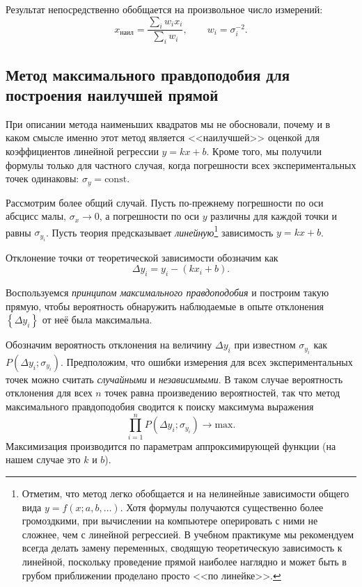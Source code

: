 \documentclass[10pt]{article}
\begin{document}
Результат непосредственно обобщается на произвольное число измерений:
\begin{equation}
x_{\text{наил}}=\frac{\sum\limits _{i}w_{i}x_{i}}{\sum\limits _{i}w_{i}},\qquad w_{i}=\sigma_{i}^{-2}.
\end{equation}

\subsection{Метод максимального правдоподобия для построения наилучшей
прямой\label{subsec:MMP}}

При описании метода наименьших квадратов мы не обосновали,
почему и в каком смысле именно этот метод является <<наилучшей>>
оценкой для коэффициентов линейной регрессии $y=kx+b$. Кроме того,
мы получили формулы только для частного случая, когда погрешности
всех экспериментальных точек одинаковы: $\sigma_{y}=\mathrm{const}$.

Рассмотрим более общий случай. Пусть по-прежнему погрешности
по оси абсцисс малы, $\sigma_{x}\to0$, а погрешности по оси $y$
различны для каждой точки и равны $\sigma_{y_{i}}$. Пусть теория
предсказывает \emph{линейную}\footnote{Отметим, что метод легко обобщается и на нелинейные зависимости общего вида $y=f\left(x;a,b,\ldots\right)$. Хотя формулы
получаются существенно более громоздкими, при вычислении на компьютере
оперировать с ними не сложнее, чем с линейной регрессией. В учебном
практикуме мы рекомендуем всегда делать замену переменных, сводящую
теоретическую зависимость к линейной, поскольку проведение прямой
наиболее наглядно и может быть в грубом приближении проделано просто
<<по линейке>>.} 
зависимость $y=kx+b$.

Отклонение точки от теоретической зависимости обозначим как
\[
\Delta y_{i}=y_{i}-\left(kx_{i}+b\right).
\]

Воспользуемся \emph{принципом максимального правдоподобия}
и построим такую прямую, чтобы вероятность обнаружить наблюдаемые
в опыте отклонения $\left\{ \Delta y_{i}\right\} $ от неё была максимальна.

Обозначим вероятность отклонения на величину $\Delta y_{i}$
при известном $\sigma_{y_{i}}$ как $P\!\left(\Delta y_{i};\sigma_{y_{i}}\right)$.
Предположим, что ошибки измерения для всех экспериментальных точек
можно считать \emph{случайными} и \emph{независимыми}.
В таком случае вероятность отклонения для всех $n$ точек равна произведению
вероятностей, так что метод максимального правдоподобия сводится к
поиску максимума выражения
\begin{equation}
\prod\limits _{i=1}^{n}P\!\left(\Delta y_{i};\sigma_{y_{i}}\right)\to\mathrm{max}.\label{eq:MMP_general}
\end{equation}
Максимизация производится по параметрам аппроксимирующей функции (на
нашем случае это $k$ и $b$).
\end{document}
